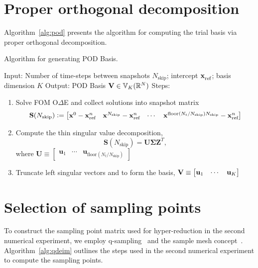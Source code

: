 \documentclass[3p,computermodern,10pt]{elsarticle}
\begin{document}
\begin{appendices}
\section{Proper orthogonal decomposition}
Algorithm~\ref{alg:pod} presents the algorithm for computing the trial basis via proper orthogonal decomposition.
\begin{algorithm}
\caption{Algorithm for generating POD Basis.}
\label{alg:pod}
Input: Number of time-steps between snapshots $N_{\text{skip}}$; intercept $\mathbf{x}_\text{ref}^{}$; basis dimension $K$ \; 
Output: POD Basis $\mathbf {V} \in \mathbb{V}_{K}(\mathbb{R}^{N})$ \;
Steps:
\begin{enumerate}
    \item Solve FOM O$\Delta$E and collect solutions into snapshot matrix
$$\mathbf{S}(N_{\text{skip}}) \vcentcolon= \begin{bmatrix} {\mathbf{x}}^{0} - \mathbf{x}_\text{ref}^{n} & {\mathbf{x}}^{N_{\text{skip}}} - \mathbf{x}_\text{ref}^{n} & \cdots & {\mathbf{x}}^{\text{floor}(N_t/N_{\text{skip}})N_{\text{skip}}} - \mathbf{x}_\text{ref}^{n} \end{bmatrix}$$
    \item Compute the thin singular value decomposition, $$\mathbf{S} (N_{\text{skip}}) = \mathbf{U \Sigma Z}^T,$$
    where $\mathbf{U} \equiv \begin{bmatrix} \mathbf{u}_1 & \cdots & \mathbf{u}_{\text{floor}(N_t/N_{\text{skip}})}\end{bmatrix}$
    \item Truncate left singular vectors and to form the basis, $\mathbf {V} \equiv \begin{bmatrix} \mathbf{u}_1 & \cdots & \mathbf{u}_K \end{bmatrix}$
\end{enumerate}


\end{algorithm}


\section{Selection of sampling points}
To construct the sampling point matrix used for hyper-reduction in the second numerical experiment, we employ q-sampling~\cite{qdeim_drmac} and the sample 
mesh concept~\cite{carlberg_gnat}. Algorithm~\ref{alg:qdeim} outlines the steps used in the second numerical experiment to compute the sampling points.


\end{appendices}
\end{document}
